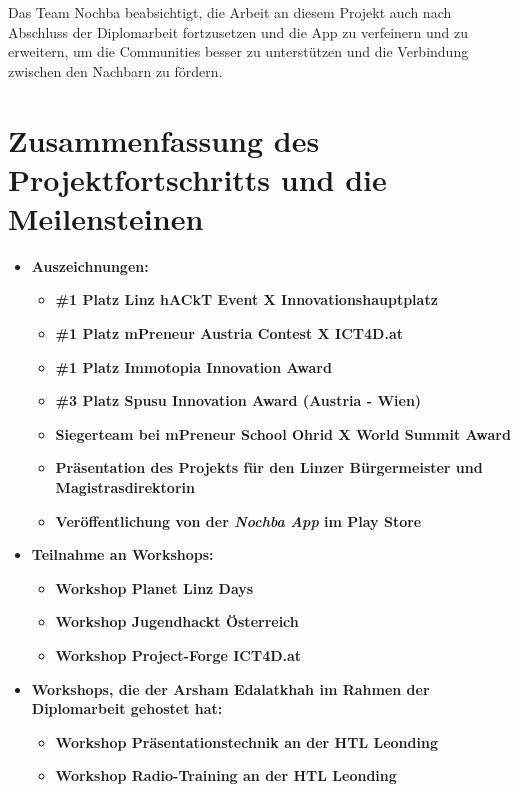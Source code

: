 Das Team Nochba beabsichtigt, die Arbeit an diesem Projekt auch nach Abschluss der Diplomarbeit fortzusetzen und die App zu verfeinern und zu erweitern, um die Communities besser zu unterstützen und die Verbindung zwischen den Nachbarn zu fördern.

\section{Zusammenfassung des Projektfortschritts und die Meilensteinen}

\begin{itemize}
    \item \textbf{Auszeichnungen:}
          \begin{itemize}
              \item \textbf{\#1 Platz Linz hACkT Event X Innovationshauptplatz}
              \item \textbf{\#1 Platz mPreneur Austria Contest X ICT4D.at}
              \item \textbf{\#1 Platz Immotopia Innovation Award}
              \item \textbf{\#3 Platz Spusu Innovation Award (Austria - Wien)}
              \item \textbf{Siegerteam bei mPreneur School Ohrid X World Summit Award}
              \item \textbf{Präsentation des Projekts für den Linzer Bürgermeister und Magistrasdirektorin}
              \item \textbf{Veröffentlichung von der \textit{Nochba App} im Play Store}
          \end{itemize}
    \item \textbf{Teilnahme an Workshops:}
          \begin{itemize}
              \item \textbf{Workshop Planet Linz Days}
              \item \textbf{Workshop Jugendhackt Österreich}
              \item \textbf{Workshop Project-Forge ICT4D.at}
          \end{itemize}
    \item \textbf{Workshops, die der Arsham Edalatkhah im Rahmen der Diplomarbeit gehostet hat:}
          \begin{itemize}
              \item \textbf{Workshop Präsentationstechnik an der HTL Leonding}
              \item \textbf{Workshop Radio-Training an der HTL Leonding}

\end{itemize}
\end{itemize}
